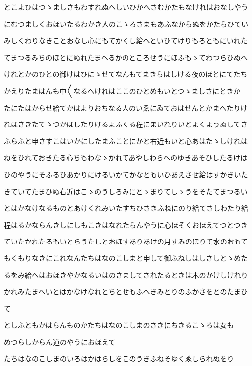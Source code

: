 \documentclass[a4paper,11pt,landscape]{ltjtarticle}
\begin{document}
とこよひはつゝましさもわすれぬへしいひかへさむかたもなけれはおなしやう
\par\medskip
にむつましくおほいたるわかき人のこゝろさまもあふなからぬをかたらひてい
\par\medskip
みしくわりなきことおなし心にもてかくし給へといひてけりもろともにいれた
\par\medskip
てまつるみちのほとにぬれたまへるかのところせうにほふもゝてわつらひぬへ
\par\medskip
けれとかのひとの御けはひにゝせてなんもてまきらはしける夜のほとにてたち
\par\medskip
かえりたまはんも中〱なるへけれはここのひとめもいとつゝましさにときか
\par\medskip
たにたはからせ給てかはよりおちなる人のいゑにゐておはせんとかまへたりけ
\par\medskip
れはさきたてゝつかはしたりけるよふくる程にまいれりいとよくようゐしてさ
\par\medskip
ふらふと申さすこはいかにしたまふことにかと右近もいと心あはたゝしけれは
\par\medskip
ねをひれておきたる心ちもわなゝかれてあやしわらへのゆきあそひしたるけは
\par\medskip
ひのやうにそふるひあかりにけるいかてかなともいひあえさせ給はすかきいた
\par\medskip
きていてたまひぬ右近はこゝのうしろみにとゝまりてしゝうをそたてまつるい
\par\medskip
とはかなけなるものとあけくれみいたすちひさきふねにのり給てさしわたり給
\par\medskip
程はるかならんきしにしもこきはなれたらんやうに心ほそくおほえてつとつき
\par\medskip
ていたかれたるもいとらうたしとおほすありあけの月すみのほりて水のおもて
\par\medskip
もくもりなきにこれなんたちはなのこしまと申して御ふねしはしさしとゝめた
\par\medskip
るをみ給へはおほきやかなるいはのさましてされたるときは木のかけしけれり
\par\medskip
かれみたまへいとはかなけなれとちとせもふへきみとりのふかさをとのたまひ
\par\medskip
て
\par\medskip
としふともかはらんものかたちはなのこしまのさきにちきるこゝろは女も
\par\medskip
めつらしからん道のやうにおほえて
\par\medskip
たちはなのこしまのいろはかはらしをこのうきふねそゆくゑしられぬをり
\par\medskip
\end{document}
